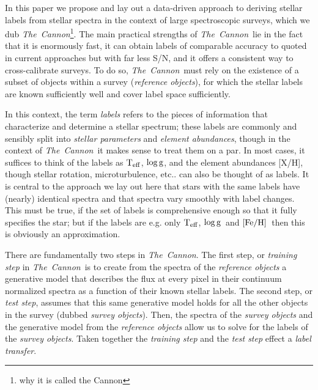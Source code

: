 \documentclass[12pt, preprint]{aastex}
\newcommand{\teff}{\mbox{$\rm T_{eff}$}}
\newcommand{\feh}{\mbox{$\rm [Fe/H]$}}
\newcommand{\logg}{\mbox{$\rm \log g$}}
\newcommand{\tc}{\textsl{The~Cannon}}
\begin{document}
In this paper we propose and lay out a data-driven approach to deriving stellar labels from stellar spectra in the context of large spectroscopic surveys, which we dub \tc\footnote{why it is called the Cannon}. 
The main practical strengths of \tc\ lie in the fact that it is enormously fast, it can obtain labels of comparable accuracy to quoted in current approaches but with far less S/N, and it offers a consistent way to cross-calibrate surveys. 
To do so, \tc\ must rely on the existence of a subset of objects within a survey
(\textit{reference objects}), for which the stellar labels are known sufficiently well and cover label space sufficiently.

In this context, the term {\sl labels} refers to the pieces of information that characterize and determine a stellar spectrum; these labels are commonly and sensibly split into {\sl stellar parameters} and {\sl element abundances}, though in the context of \tc\ it makes sense to treat them on a par. 
In most cases, it suffices to think of the labels as \teff , \logg, and the element abundances [X/H], though stellar rotation, microturbulence, etc.. can also be thought of as labels. It is central to the approach we lay out here that stars with the same labels have (nearly) identical spectra and that spectra vary smoothly with label changes. 
This must be true, if the set of labels is comprehensive enough so that it fully specifies the star; but if the labels are e.g. only \teff, \logg\ and \feh\ then this is obviously an approximation. 

There are fundamentally two steps in \tc . 
The first step, or \textit{training step} in \tc\ is to create from the spectra of the \textit{reference objects} a generative model that describes
 the flux at every pixel in their continuum normalized spectra as a function of their known stellar labels.
The second step, or \textit{test step}, assumes that this same generative model holds for all the other objects in the survey (dubbed \textit{survey objects}). 
Then, the spectra of the \textit{survey objects} and the generative model from the \textit{reference objects}
allow us to solve for the labels of the \textit{survey objects}. 
Taken together the \textit{training step} and the \textit{test step} effect a \textit{label transfer}. 
\end{document}
